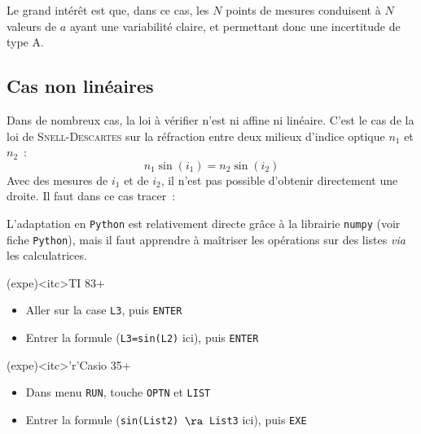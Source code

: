 \documentclass[a4paper, 12pt, garamond]{book}
\begin{document}
Le grand intérêt est que, dans ce cas, les $N$ points de mesures conduisent à
$N$ valeurs de $a$ ayant une variabilité claire, et permettant donc une
incertitude de type A.

\subsection{Cas non linéaires}
Dans de nombreux cas, la loi à vérifier n'est ni affine ni linéaire. C'est le
cas de la loi de \textsc{Snell}-\textsc{Descartes} sur la réfraction entre deux
milieux d'indice optique $n_1$ et $n_2$~:
\[
	n_1\sin(i_1) = n_2\sin(i_2)
\]
Avec des mesures de $i_1$ et de $i_2$, il n'est pas possible d'obtenir
directement une droite. Il faut dans ce cas tracer~:
%
\vspace{15pt}

L'adaptation en \texttt{Python} est relativement directe grâce à la librairie
\texttt{numpy} (voir fiche \texttt{Python}), mais il faut apprendre à maîtriser
les opérations sur des listes \textit{via} les calculatrices.
\begin{tcbraster}[raster columns=2, raster equal height=rows]
  \begin{tcn}(expe)<itc>{TI 83+}
    \begin{itemize}[leftmargin=10pt]
      \item Aller sur la case \texttt{L3}, puis \texttt{ENTER}
      \item Entrer la formule (\texttt{L3=sin(L2)} ici), puis \texttt{ENTER}
    \end{itemize}
  \end{tcn}
  \begin{tcn}(expe)<itc>'r'{Casio 35+}
    \begin{itemize}[leftmargin=10pt]
      \item Dans menu \texttt{RUN}, touche \texttt{OPTN} et \texttt{LIST}
      \item Entrer la formule (\texttt{sin(List2) $\ra$ List3} ici), puis
            \texttt{EXE}
    \end{itemize}
  \end{tcn}
\end{tcbraster}
\end{document}
